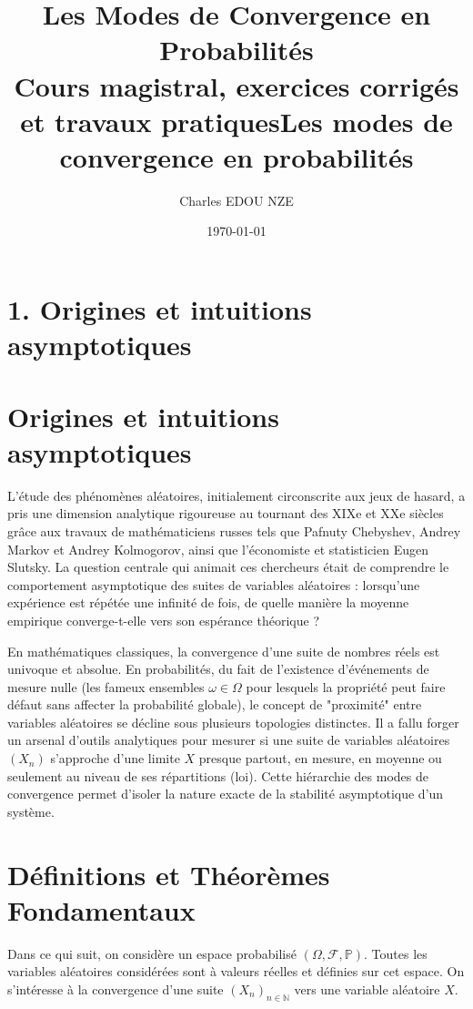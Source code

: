 \documentclass[11pt,a4paper]{article}
\title{\Huge Les Modes de Convergence en Probabilités \\ \large Cours magistral, exercices corrigés et travaux pratiques}
\author{\Large Charles EDOU NZE}
\date{\today}
\begin{document}
\title{\Huge Les modes de convergence en probabilités}
\maketitle

\section{1. Origines et intuitions asymptotiques}



\section{Origines et intuitions asymptotiques}

L'étude des phénomènes aléatoires, initialement circonscrite aux jeux de hasard, a pris une dimension analytique rigoureuse au tournant des XIXe et XXe siècles grâce aux travaux de mathématiciens russes tels que Pafnuty Chebyshev, Andrey Markov et Andrey Kolmogorov, ainsi que l'économiste et statisticien Eugen Slutsky. La question centrale qui animait ces chercheurs était de comprendre le comportement asymptotique des suites de variables aléatoires : lorsqu'une expérience est répétée une infinité de fois, de quelle manière la moyenne empirique converge-t-elle vers son espérance théorique ?

En mathématiques classiques, la convergence d'une suite de nombres réels est univoque et absolue. En probabilités, du fait de l'existence d'événements de mesure nulle (les fameux ensembles $\omega \in \Omega$ pour lesquels la propriété peut faire défaut sans affecter la probabilité globale), le concept de "proximité" entre variables aléatoires se décline sous plusieurs topologies distinctes. Il a fallu forger un arsenal d'outils analytiques pour mesurer si une suite de variables aléatoires $(X_n)$ s'approche d'une limite $X$ presque partout, en mesure, en moyenne ou seulement au niveau de ses répartitions (loi). Cette hiérarchie des modes de convergence permet d'isoler la nature exacte de la stabilité asymptotique d'un système.

\section{Définitions et Théorèmes Fondamentaux}

Dans ce qui suit, on considère un espace probabilisé $(\Omega, \mathcal{F}, \mathbb{P})$. Toutes les variables aléatoires considérées sont à valeurs réelles et définies sur cet espace. On s'intéresse à la convergence d'une suite $(X_n)_{n \in \mathbb{N}}$ vers une variable aléatoire $X$.
\end{document}
